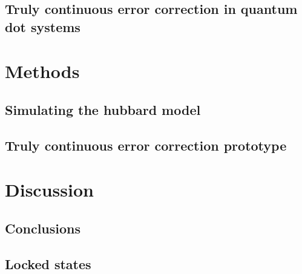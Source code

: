 \documentclass{report}
\begin{document}
\section{Truly continuous error correction in quantum dot systems}

\chapter{Methods}

\section{Simulating the hubbard model}

\section{Truly continuous error correction prototype}

\chapter {Discussion}

\section{Conclusions}

\printbibliography

\begin{appendices}

\section{Locked states}
\end{appendices}
\end{document}
